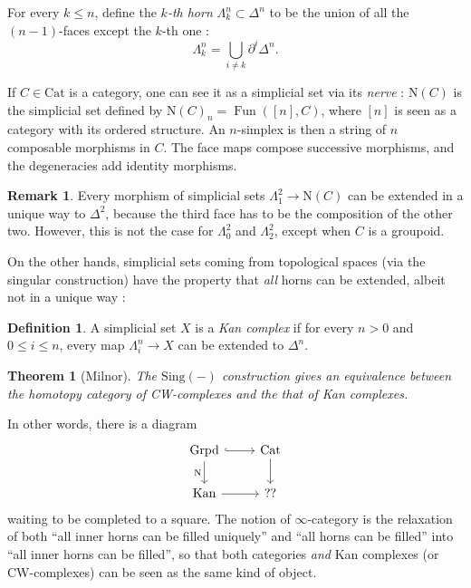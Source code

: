 \documentclass[11pt]{article}
\newtheorem{theorem}{Theorem}
\theoremstyle{definition}
\newtheorem{definition}{Definition}
\newtheorem{remark}{Remark}
\newcommand{\Cat}{\mathrm{Cat}}
\newcommand{\Fun}{\operatorname{Fun}}
\newcommand{\Grpd}{\mathrm{Grpd}}
\newcommand{\Kan}{\mathrm{Kan}}
\newcommand{\N}{\mathrm{N}}
\begin{document}
For every $k \leqslant n$, define the \emph{$k$-th horn} $\Lambda_k^n \subset \Delta^n$ to be the union of all the $(n-1)$-faces except the $k$-th one :
\[
    \Lambda_k^n = \bigcup_{i \neq k} \partial^i \Delta^n.
\]

If $C \in \Cat$ is a category, one can see it as a simplicial set via its \emph{nerve} : $\N(C)$ is the simplicial set defined by $\N(C)_n = \Fun([n], C)$, where $[n]$ is seen as a category with its ordered structure.
An $n$-simplex is then a string of $n$ composable morphisms in $C$.
The face maps compose successive morphisms, and the degeneracies add identity morphisms.

\begin{remark}
    Every morphism of simplicial sets $\Lambda_1^2 \to \N(C)$ can be extended in a unique way to $\Delta^2$, because the third face has to be the composition of the other two.
    However, this is not the case for $\Lambda_0^2$ and $\Lambda_2^2$, except when $C$ is a groupoid.
\end{remark}

On the other hands, simplicial sets coming from topological spaces (via the singular construction) have the property that \emph{all} horns can be extended, albeit not in a unique way :

\begin{definition}
    A simplicial set $X$ is a \emph{Kan complex} if for every $n > 0$ and $0 \leqslant i \leqslant n$, every map $\Lambda_i^n \to X$ can be extended to $\Delta^n$.
\end{definition}

\begin{theorem}[Milnor]
    The $\mathrm{Sing}(-)$ construction gives an equivalence between the homotopy category of CW-complexes and the that of Kan complexes.
\end{theorem}

In other words, there is a diagram
\[\begin{tikzcd}
	\Grpd & \Cat \\
	\Kan & {??}
	\arrow[hook, from=1-1, to=1-2]
	\arrow["\N"', from=1-1, to=2-1]
	\arrow[from=1-2, to=2-2]
	\arrow[from=2-1, to=2-2]
\end{tikzcd}\]
waiting to be completed to a square.
The notion of $\infty$-category is the relaxation of both \enquote{all inner horns can be filled uniquely} and \enquote{all horns can be filled} into \enquote{all inner horns can be filled}, so that both categories \emph{and} Kan complexes (or CW-complexes) can be seen as the same kind of object.
\end{document}
